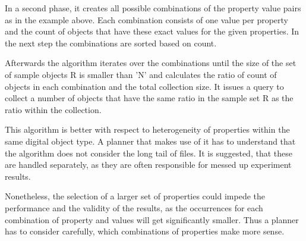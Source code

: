 In a second phase, it creates all possible combinations of the property value pairs as in the example above. Each combination consists of one value per property and the count of objects that have these exact values for the given properties. In the next step the combinations are sorted based on count.

Afterwards the algorithm iterates over the combinations until the size of the set of sample objects R is smaller than 'N' and calculates the ratio of count of objects in each combination and the total collection size. It issues a query to collect a number of objects that have the same ratio in the sample set R as the ratio within the collection.

This algorithm is better with respect to heterogeneity of properties within the same digital object type. A planner that makes use of it has to understand that the algorithm does not consider the long tail of files. It is suggested, that these
are handled separately, as they are often responsible for messed up experiment results.

Nonetheless, the selection of a larger set of properties could impede the performance and the validity of the results, as the occurrences for each combination of property and values will get significantly smaller. Thus a planner has to consider carefully, which combinations of properties make more sense.

